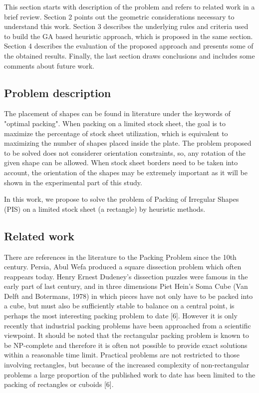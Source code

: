 \documentclass{llncs}
\begin{document}
This section starts with description of the problem and refers to related work in a brief review. Section 2 points out the geometric considerations necessary to understand this work. Section 3 describes the underlying rules and criteria used to build the GA based heuristic approach, which is proposed in the same section. Section 4 describes the evaluation of the proposed approach and presents some of the obtained results. Finally, the last section draws conclusions and includes some comments about future work.
%
\subsection{Problem description}
%
The placement of shapes can be found in literature under the keywords of "optimal packing". When packing on a limited stock sheet, the
goal is to maximize the percentage of stock sheet utilization, which is equivalent to maximizing the number of shapes placed inside the plate. The problem proposed to be solved does not considerer orientation constraints, so, any rotation of the given shape can be allowed. When stock sheet borders need to be taken into account, the orientation of the shapes may be extremely important as it will be shown in the experimental part of this study.

In this work, we propose to solve the problem of Packing of Irregular Shapes (PIS) on a limited stock sheet (a rectangle) by heuristic methods.
%
\subsection{Related work}
%
There are references in the literature to the Packing Problem since the 10th century. Persia, Abul Wefa produced a square dissection problem which often reappears today. Henry Ernest Dudeney's dissection puzzles were famous in the early part of last century, and in three dimensions Piet Hein's Soma Cube (Van Delft and Botermans, 1978) in which pieces have not only have to be packed into a cube, but must also be sufficiently stable to balance on a central point, is perhaps the most interesting packing problem to date [6]. However it is only recently that industrial packing problems have been approached from a scientific viewpoint. It should be noted that the rectangular packing problem is known to be NP-complete and therefore it is often not possible to provide exact solutions within a reasonable time limit. Practical problems are not restricted to those involving rectangles, but because of the increased complexity of non-rectangular problems a large proportion of the published work to date has been limited to the packing of rectangles or cuboids [6]. 
%
\end{document}
